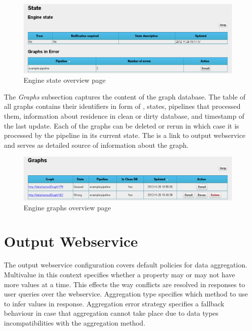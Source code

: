 \begin{figure}[!ht]
    \centering
    \includegraphics[width=\textwidth]{images/fe-engine-state.png}
    \caption{Engine state overview page}
	\label{fig:feEngineState}
\end{figure}
\FloatBarrier

The \emph{Graphs} subsection captures the content of the graph database. The table of all graphs contains their identifiers in form of , states, pipelines that processed them, information about residence in clean or dirty database, and timestamp of the last update. Each of the graphs can be deleted or rerun in which case it is processed by the pipeline in its current state. The  is a link to output webservice and serves as detailed source of information about the graph.

\begin{figure}[!ht]
    \centering
    \includegraphics[width=\textwidth]{images/fe-engine-graphs.png}
    \caption{Engine graphs overview page}
	\label{fig:feEngineGraphs}
\end{figure}

\section{Output Webservice}
\label{sec:outputWSMgmt}

The output webservice configuration covers default policies for data aggregation. Multivalue in this context specifies whether a property may or may not have more values at a time. This effects the way conflicts are resolved in responses to user queries over the webservice. Aggregation type specifies which method to use to infer values in response. Aggregation error strategy specifies a fallback behaviour in case that aggregation cannot take place due to data types incompatibilities with the aggregation method.

